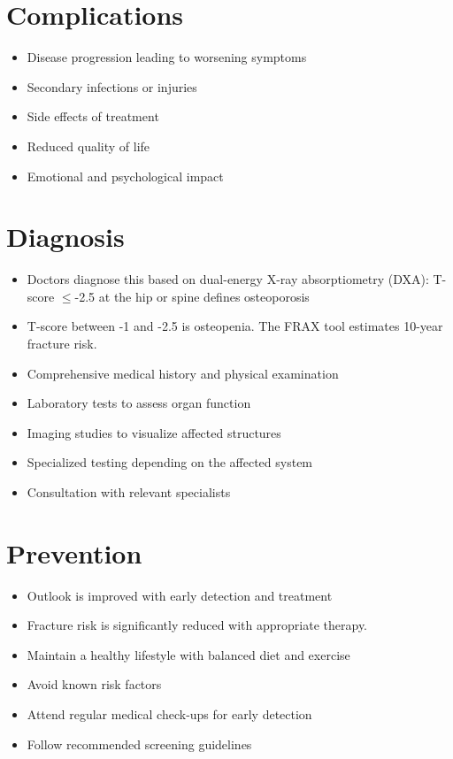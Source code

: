 \section{Complications}
\begin{itemize}[noitemsep]
  \item Disease progression leading to worsening symptoms
  \item Secondary infections or injuries
  \item Side effects of treatment
  \item Reduced quality of life
  \item Emotional and psychological impact
\end{itemize}
\section{Diagnosis}
\begin{itemize}[noitemsep]
  \item Doctors diagnose this based on dual-energy X-ray absorptiometry (DXA): T-score $\leq$-2.5 at the hip or spine defines osteoporosis
  \item T-score between -1 and -2.5 is osteopenia. The FRAX tool estimates 10-year fracture risk.
  \item Comprehensive medical history and physical examination
  \item Laboratory tests to assess organ function
  \item Imaging studies to visualize affected structures
  \item Specialized testing depending on the affected system
  \item Consultation with relevant specialists
\end{itemize}
\section{Prevention}
\begin{itemize}[noitemsep]
  \item Outlook is improved with early detection and treatment
  \item Fracture risk is significantly reduced with appropriate therapy.
  \item Maintain a healthy lifestyle with balanced diet and exercise
  \item Avoid known risk factors
  \item Attend regular medical check-ups for early detection
  \item Follow recommended screening guidelines
\end{itemize}
